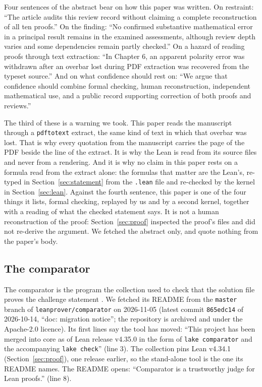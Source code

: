 Four sentences of the abstract bear on how this paper was written. On
restraint: ``The article audits this review record without claiming a
complete reconstruction of all ten proofs.'' On the finding: ``No
confirmed substantive mathematical error in a principal result remains in
the examined assessments, although review depth varies and some
dependencies remain partly checked.'' On a hazard of reading proofs
through text extraction: ``In Chapter 6, an apparent polarity error was
withdrawn after an overbar lost during PDF extraction was recovered from
the typeset source.'' And on what confidence should rest on: ``We argue
that confidence should combine formal checking, human reconstruction,
independent mathematical use, and a public record supporting correction
of both proofs and reviews.''

The third of these is a warning we took. This paper reads the manuscript
through a \texttt{pdftotext} extract, the same kind of text in which that
overbar was lost. That is why every quotation from the manuscript carries
the page of the PDF beside the line of the extract. It is why the Lean is
read from its source files and never from a rendering. And it is why no
claim in this paper rests on a formula read from the extract alone: the
formulas
that matter are the Lean's, re-typed in Section~\ref{sec:statement} from
the \texttt{.lean} file and re-checked by the kernel in
Section~\ref{sec:lean}. Against the fourth sentence, this paper is one of
the four things it lists, formal checking, replayed by us and by a
second kernel, together with a reading of what the checked statement
says. It is not a human reconstruction of the proof: Section~\ref{sec:proof}
inspected the proof's files and did not re-derive the argument. We
fetched the abstract only, and quote nothing from the paper's body.

\subsection{The comparator}
\label{sec:related-comparator}

The comparator is the program the collection used to check that the
solution file proves the challenge statement
\citep{LeanComparator}. We fetched its README from the
\texttt{master} branch of \texttt{leanprover/comparator} on 2026-11-05
(latest commit \texttt{865edc14} of 2026-10-14, ``doc: migration
notice''; the repository is archived and under the Apache-2.0 licence).
Its first lines say the tool has moved: ``This project has been merged
into core as of Lean release v4.35.0 in the form of \texttt{lake
comparator} and the accompanying \texttt{lake check}'' (line 3). The
collection pins Lean v4.34.1 (Section~\ref{sec:proof}), one release
earlier, so the stand-alone tool is the one its README names. The README
opens: ``Comparator is a trustworthy judge for Lean proofs.'' (line 8).

